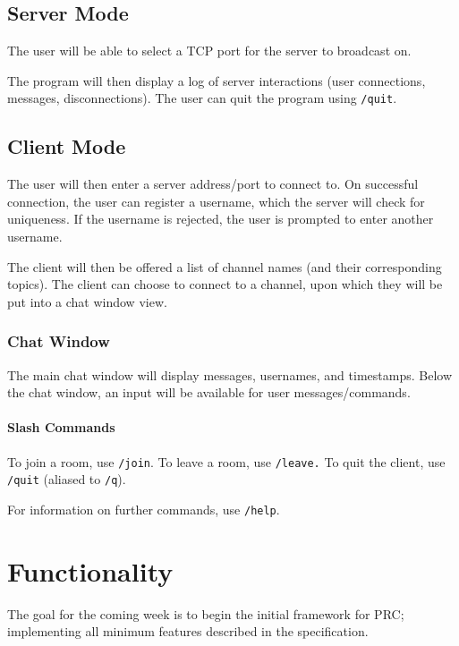 \documentclass{article}
\begin{document}
\subsection{Server Mode}
The user will be able to select a TCP port for the server to broadcast on.

The program will then display a log of server interactions (user connections, messages, disconnections). The user can quit the program using \verb|/quit|.

\subsection{Client Mode}
The user will then enter a server address/port to connect to. On successful connection, the user can register a username, which the server will check for uniqueness. If the username is rejected, the user is prompted to enter another username.

The client will then be offered a list of channel names (and their corresponding topics). The client can choose to connect to a channel, upon which they will be put into a chat window view.


\subsubsection{Chat Window}
The main chat window will display messages, usernames, and timestamps. Below the chat window, an input will be available for user messages/commands.

\paragraph{Slash Commands}
To join a room, use \verb|/join|. To leave a room, use \verb|/leave.| To quit the client, use \verb|/quit| (aliased to \verb|/q|).

For information on further commands, use \verb|/help|.

\section{Functionality}
The goal for the coming week is to begin the initial framework for PRC; implementing all minimum features described in the specification.
\end{document}

